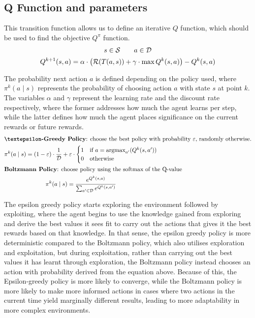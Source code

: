 \subsection{Q Function and parameters}

This transition function allows us to define an iterative $Q$ function, which should be used to find the objective $Q^\pi$ function.
\begin{gather*}
	s \in \mathcal{S} \qquad a \in \mathcal{D} \\
	Q^{k + 1}(s, a) = \alpha \cdot \left( \mathcal{R}( T( a, s ) ) + \gamma \cdot \max{Q^k(s, a)} \right) - Q^k(s, a)
\end{gather*}

\newpage{}
The probability next action $a$ is defined depending on the policy used, where $\pi^k(a \mid s)$ represents the probability of choosing action $a$ with state $s$ at point $k$. The variables $\alpha$ and $\gamma$ represent the learning rate and the discount rate respectively, where the former addresses how much the agent learns per step, while the latter defines how much the agent places significance on the current rewards or future rewards.
\begin{gather*}
	\intertext{\textbf{\textepsilon-Greedy Policy}: choose the best policy with probability $\varepsilon$, randomly otherwise.}
	\pi^k(a \mid s) = 
		(1 - \varepsilon) \cdot \frac{1}{\mathcal{D}} + \varepsilon \cdot \begin{cases}
			1 & \text{if } a = \argmax_{a'} (Q^k(s, a')) \\
			0 & \text{otherwise}
		\end{cases} \\
	\intertext{\textbf{Boltzmann Policy}: choose policy using the softmax of the Q-value}
	\pi^k(a \mid s) = \frac{e^{Q^k(s, a)}}{\sum_{a' \in \mathcal{D}}{e^{Q^k(s, a')}}}
\end{gather*}

The epsilon greedy policy starts exploring the environment followed by exploiting, where the agent begins to use the knowledge gained from exploring and derive the best values it sees fit to carry out the actions that gives it the best rewards based on that knowledge. In that sense, the epsilon greedy policy is more deterministic compared to the Boltzmann policy, which also utilises exploration and exploitation, but during exploitation, rather than carrying out the best values it has learnt through exploration, the Boltzmann policy instead chooses an action with probability derived from the equation above. Because of this, the Epsilon-greedy policy is more likely to converge, while the Boltzmann policy is more likely to make more informed actions in cases where two actions in the current time yield marginally different results, leading to more adaptability in more complex environments.

